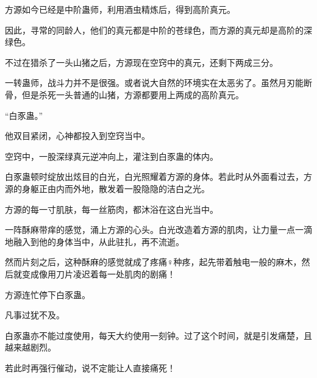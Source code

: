 \begin{this_body}
方源如今已经是中阶蛊师，利用酒虫精炼后，得到高阶真元。

因此，寻常的同龄人，他们的真元都是中阶的苍绿色，而方源的真元却是高阶的深绿色。

不过在猎杀了一头山猪之后，方源现在空窍中的真元，还剩下两成三分。

一转蛊师，战斗力并不是很强。或者说大自然的环境实在太恶劣了。虽然月刃能断骨，但是杀死一头普通的山猪，方源都要用上两成的高阶真元。

“白豕蛊。”

他双目紧闭，心神都投入到空窍当中。

空窍中，一股深绿真元逆冲向上，灌注到白豕蛊的体内。

白豕蛊顿时绽放出炫目的白光，白光照耀着方源的身体。若此时从外面看过去，方源的身躯正由内而外地，散发着一股隐隐的洁白之光。

方源的每一寸肌肤，每一丝筋肉，都沐浴在这白光当中。

一阵酥麻带痒的感觉，涌上方源的心头。白光改造着方源的肌肉，让力量一点一滴地融入到他的身体当中，从此驻扎，再不流逝。

然而片刻之后，这种酥麻的感觉就成了疼痛♀种疼，起先带着触电一般的麻木，然后就变成像用刀片凌迟着每一处肌肉的剧痛！

方源连忙停下白豕蛊。

凡事过犹不及。

白豕蛊亦不能过度使用，每天大约使用一刻钟。过了这个时间，就是引发痛楚，且越来越剧烈。

若此时再强行催动，说不定能让人直接痛死！

\end{this_body}

